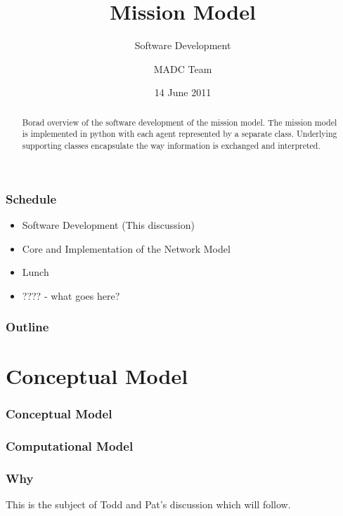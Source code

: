 \documentclass{beamer}
\begin{document}
\title{Mission Model}
\subtitle{Software Development}
\author{MADC Team}
\date{14 June 2011}

\begin{frame}
  \titlepage
  \begin{abstract}
    Borad overview of the software development of the mission
    model. The mission model is implemented in python with each agent
    represented by a separate class. Underlying supporting classes
    encapsulate the way information is exchanged and interpreted.
  \end{abstract}
\end{frame}



\begin{frame}
  \frametitle{Schedule}

  \begin{itemize}
  \item Software Development (This discussion) 
  \item Core and Implementation of the Network Model
  \item Lunch
  \item ???? - what goes here?
  \end{itemize}

\end{frame}


\begin{frame}
  \frametitle{Outline}
\end{frame}



\section{Conceptual Model}


\begin{frame}
  \frametitle{Conceptual Model}

\end{frame}


\begin{frame}
  \frametitle{Computational Model}
\end{frame}


\begin{frame}
  \frametitle{Why}

  This is the subject of Todd and Pat's discussion which will follow.

\end{frame}
\end{document}
